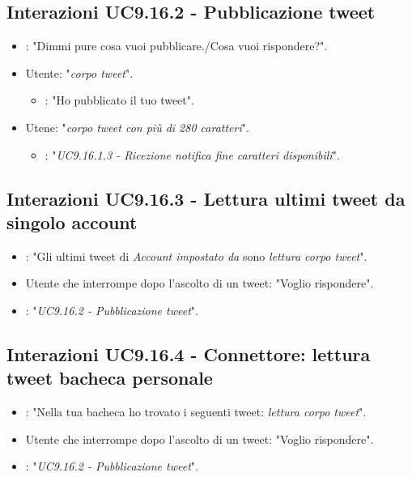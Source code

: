 \subsection{Interazioni UC9.16.2 - Pubblicazione tweet}
\begin{itemize}
        \item {}: "Dimmi pure cosa vuoi pubblicare./Cosa vuoi rispondere?".
        \item Utente: "{\it corpo tweet}".
        \begin{itemize}
        \item {}: "Ho pubblicato il tuo tweet".
           \end{itemize}
        \item Utene: "{\it corpo tweet con più di 280 caratteri}".
           \begin{itemize}
        \item {}: "{\it UC9.16.1.3 - Ricezione notifica fine caratteri disponibili}".
           \end{itemize}
        
    \end{itemize}


\subsection{Interazioni UC9.16.3 - Lettura ultimi tweet da singolo account}
 \begin{itemize}
        \item {}: "Gli ultimi tweet di {\it Account impostato da } sono {\it lettura corpo tweet}".
        \item Utente che interrompe dopo l'ascolto di un tweet: "Voglio rispondere".
        \item {}: "{\it UC9.16.2 - Pubblicazione tweet}".
    \end{itemize}


\subsection{Interazioni UC9.16.4 - Connettore: lettura tweet bacheca personale}
 \begin{itemize}
        \item {}: "Nella tua bacheca ho trovato i seguenti tweet: {\it lettura corpo tweet}".
        \item Utente che interrompe dopo l'ascolto di un tweet: "Voglio rispondere".
        \item {}: "{\it UC9.16.2 - Pubblicazione tweet}".
    \end{itemize}


